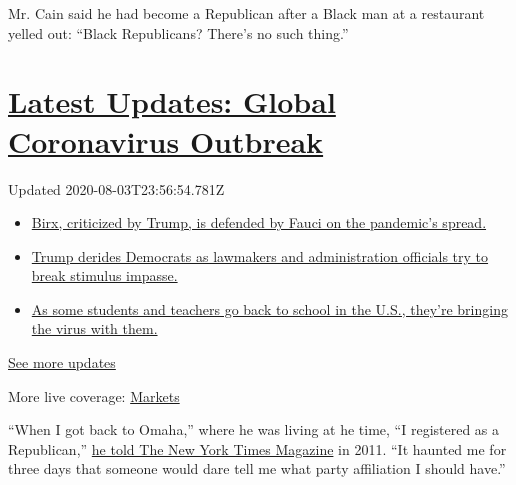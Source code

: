 Mr. Cain said he had become a Republican after a Black man at a
restaurant yelled out: ``Black Republicans? There's no such thing.''

\hypertarget{latest-updates-global-coronavirus-outbreak}{%
\section{\texorpdfstring{\href{https://www.nytimes.com/2020/08/03/world/coronavirus-covid-19.html?action=click\&pgtype=Article\&state=default\&region=MAIN_CONTENT_1\&context=storylines_live_updates}{Latest
Updates: Global Coronavirus
Outbreak}}{Latest Updates: Global Coronavirus Outbreak}}\label{latest-updates-global-coronavirus-outbreak}}

Updated 2020-08-03T23:56:54.781Z

\begin{itemize}
\tightlist
\item
  \href{https://www.nytimes.com/2020/08/03/world/coronavirus-covid-19.html?action=click\&pgtype=Article\&state=default\&region=MAIN_CONTENT_1\&context=storylines_live_updates\#link-4e40df05}{Birx,
  criticized by Trump, is defended by Fauci on the pandemic's spread.}
\item
  \href{https://www.nytimes.com/2020/08/03/world/coronavirus-covid-19.html?action=click\&pgtype=Article\&state=default\&region=MAIN_CONTENT_1\&context=storylines_live_updates\#link-15e7f995}{Trump
  derides Democrats as lawmakers and administration officials try to
  break stimulus impasse.}
\item
  \href{https://www.nytimes.com/2020/08/03/world/coronavirus-covid-19.html?action=click\&pgtype=Article\&state=default\&region=MAIN_CONTENT_1\&context=storylines_live_updates\#link-4c85ed64}{As
  some students and teachers go back to school in the U.S., they're
  bringing the virus with them.}
\end{itemize}

\href{https://www.nytimes.com/2020/08/03/world/coronavirus-covid-19.html?action=click\&pgtype=Article\&state=default\&region=MAIN_CONTENT_1\&context=storylines_live_updates}{See
more updates}

More live coverage:
\href{https://www.nytimes.com/live/2020/08/03/business/stock-market-today-coronavirus?action=click\&pgtype=Article\&state=default\&region=MAIN_CONTENT_1\&context=storylines_live_updates}{Markets}

``When I got back to Omaha,'' where he was living at he time, ``I
registered as a Republican,''
\href{https://www.nytimes.com/2011/07/03/magazine/herman-cain-talks-about-herman-cain.html}{he
told The New York Times Magazine} in 2011. ``It haunted me for three
days that someone would dare tell me what party affiliation I should
have.''

